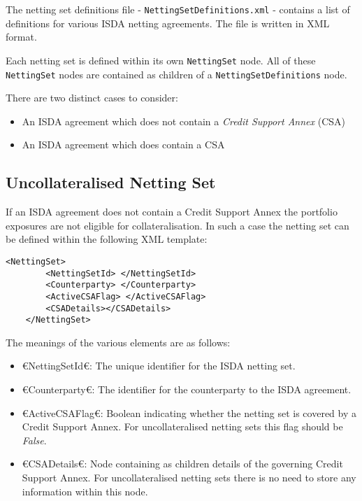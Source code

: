 The netting set definitions file - {\tt NettingSetDefinitions.xml} - 
contains a list of
definitions for various ISDA netting agreements. The file is written
in XML format. 

\vspace{1em}

Each netting set is defined within its own \lstinline!NettingSet!
node. All of these \lstinline!NettingSet! nodes are contained as
children of a \lstinline!NettingSetDefinitions! node.

\vspace{1em}

There are two distinct cases to consider:

\begin{itemize}
\item An ISDA agreement which does not contain a \emph{Credit Support
    Annex} (CSA)
\item An ISDA agreement which does contain a CSA
\end{itemize}
\subsection{Uncollateralised Netting Set}
If an ISDA agreement does not contain a Credit Support Annex the
portfolio exposures are not eligible for collateralisation. In such a
case the netting set can be defined within the following XML template:

{\footnotesize
\begin{lstlisting}[caption={uncollateralised netting set definition}, label=lst:nettingSetUncollat]
    <NettingSet>
        <NettingSetId> </NettingSetId>
        <Counterparty> </Counterparty>
        <ActiveCSAFlag> </ActiveCSAFlag>
        <CSADetails></CSADetails>
    </NettingSet>
\end{lstlisting}
}

The meanings of the various elements are as follows:
\begin{itemize}
\item €NettingSetId€: The unique identifier for the ISDA netting set.
\item €Counterparty€: The identifier for the counterparty to the ISDA agreement.
\item €ActiveCSAFlag€: Boolean indicating whether the netting set is
  covered by a Credit Support Annex. For uncollateralised netting sets
  this flag should be \emph{False}.
\item €CSADetails€: Node containing as children details of the governing
  Credit Support Annex. For uncollateralised netting sets there is no
  need to store any information within this node.
\end{itemize}
